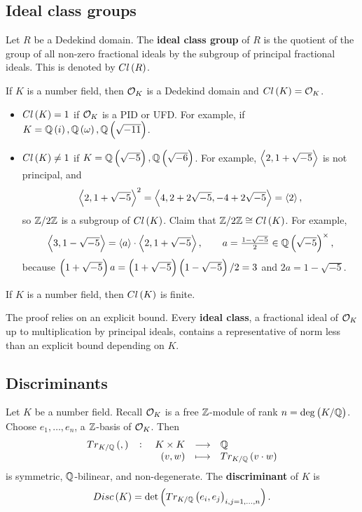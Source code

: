 
\subsection{Ideal class groups}

\begin{definition}
Let $ R $ be a Dedekind domain. The \textbf{ideal class group} of $ R $ is the quotient of the group of all non-zero fractional ideals by the subgroup of principal fractional ideals. This is denoted by $ Cl\br{R} $.
\end{definition}

If $ K $ is a number field, then $ \mathcal{O}_K $ is a Dedekind domain and $ Cl\br{K} = \OO_K $.

\begin{example*}
\hfill
\begin{itemize}
\item $ Cl\br{K} = 1 $ if $ \mathcal{O}_K $ is a PID or UFD. For example, if $ K = \Q\br{i}, \Q\br{\omega}, \Q\br{\sqrt{-11}} $.
\item $ Cl\br{K} \ne 1 $ if $ K = \Q\br{\sqrt{-5}}, \Q\br{\sqrt{-6}} $. For example, $ \left\langle 2, 1 + \sqrt{-5} \right\rangle $ is not principal, and
$$ \left\langle 2, 1 + \sqrt{-5} \right\rangle^2 = \left\langle 4, 2 + 2\sqrt{-5}, -4 + 2\sqrt{-5} \right\rangle = \left\langle 2 \right\rangle, $$
so $ \mathbb{Z} / 2\mathbb{Z} $ is a subgroup of $ Cl\br{K} $. Claim that $ \Z / 2\Z \cong Cl\br{K} $. For example,
$$ \abr{3, 1 - \sqrt{-5}} = \abr{a} \cdot \abr{2, 1 + \sqrt{-5}}, \qquad a = \tfrac{1 - \sqrt{-5}}{2} \in \Q\br{\sqrt{-5}}^\times, $$
because $ \br{1 + \sqrt{-5}}a = \br{1 + \sqrt{-5}}\br{1 - \sqrt{-5}} / 2 = 3 $ and $ 2a = 1 - \sqrt{-5} $.
\end{itemize}
\end{example*}

\begin{theorem}
If $ K $ is a number field, then $ Cl\br{K} $ is finite.
\end{theorem}

The proof relies on an explicit bound. Every \textbf{ideal class}, a fractional ideal of $ \mathcal{O}_K $ up to multiplication by principal ideals, contains a representative of norm less than an explicit bound depending on $ K $.

\subsection{Discriminants}

Let $ K $ be a number field. Recall $ \mathcal{O}_K $ is a free $ \mathbb{Z} $-module of rank $ n = \deg\br{K / \Q} $. Choose $ e_1, \dots, e_n $, a $ \mathbb{Z} $-basis of $ \mathcal{O}_K $. Then
$$ \function[Tr_{K / \Q}\br{,}]{K \times K}{\Q}{\br{v, w}}{Tr_{K / \Q}\br{v \cdot w}} $$
is symmetric, $ \mathbb{Q} $-bilinear, and non-degenerate. The \textbf{discriminant} of $ K $ is
$$ Disc\br{K} = \det\br{Tr_{K / \Q}\br{e_i, e_j}_{i, j = 1, \dots, n}}. $$

